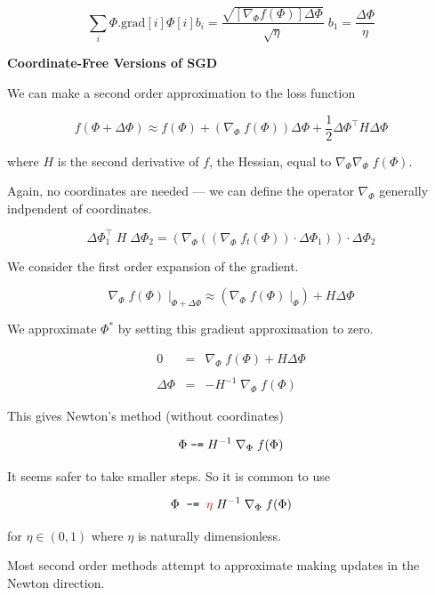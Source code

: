 {\vfill
$$\sum_i \Phi.\mathrm{grad}[i]\Phi[i]b_i = \frac{\sqrt{[\nabla_\Phi f(\Phi)]\Delta \Phi}}{\sqrt{\eta}}\;b_1 = \frac{\Delta \Phi}{\eta}$$

\slide{}
\centerline{\bf Coordinate-Free Versions of SGD}
\vfill
\vfill


We can make a second order approximation to the loss function

\vfill
$$f(\Phi + \Delta \Phi) \approx f(\Phi) + (\nabla_\Phi \;f(\Phi))\Delta \Phi + \frac{1}{2} \Delta \Phi^\top H \Delta \Phi$$

\vfill
where $H$ is the second derivative of $f$, the Hessian, equal to $\nabla_\Phi \nabla_\Phi \;f(\Phi)$.

\vfill
Again, no coordinates are needed --- we can define the operator $\nabla_\Phi$ generally indpendent of coordinates.

\vfill
$$\Delta \Phi_1^\top\;H\; \Delta \Phi_2 = \left(\nabla_\Phi \left((\nabla_\Phi\; f_t(\Phi))\cdot \Delta \Phi_1\right)\right)\cdot \Delta \Phi_2$$


We consider the first order expansion of the gradient.

$$\nabla_\Phi\; f(\Phi)\; |_{\Phi + \Delta \Phi}\approx \left(\nabla _\Phi \;f(\Phi)\; |_{\Phi}\right) + H \Delta \Phi$$

\vfill
We approximate $\Phi^*$ by setting this gradient approximation to zero.

\vfill
\begin{eqnarray*}
  0 & = & \nabla _\Phi\; f(\Phi) + H \Delta \Phi \\
  \\
\Delta \Phi & = & - H^{-1} \;\nabla _\Phi \; f(\Phi)
\end{eqnarray*}

\vfill
This gives Newton's method (without coordinates)

\vfill
{\color{red} $$\Phi \;\mbox{\tt -=} \; H^{-1}\; \nabla_\Phi \;f(\Phi)$$}


It seems safer to take smaller steps.  So it is common to use

\vfill
$$\Phi\;\;\mbox{\tt -=} \;\; {\color{red} \eta}\; H^{-1}\;\nabla_\Phi\; f(\Phi)$$

\vfill
for $\eta \in (0,1)$ where $\eta$ is naturally dimensionless.

\vfill
Most second order methods attempt to approximate making updates in the Newton direction.

}
